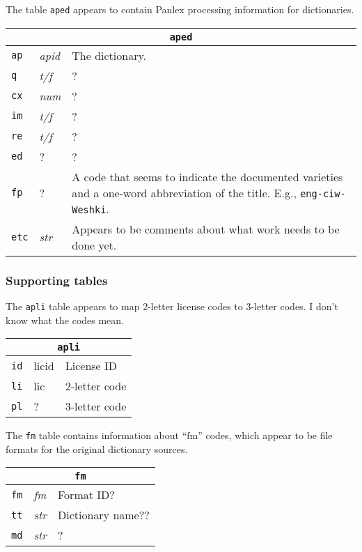 The table {\tt aped} appears to contain Panlex processing information
for dictionaries.
\begin{trivlist}\item
\begin{tabular}{|llp{3.5in}|}
\hline
\multicolumn{3}{|c|}{\tt aped}\\
\hline
{\tt ap} & {\it apid} & The dictionary.\\
{\tt q}  & {\it t/f}  & ?\\
{\tt cx} & {\it num}  & ?\\
{\tt im} & {\it t/f}  & ?\\
{\tt re} & {\it t/f}  & ?\\
{\tt ed} & ?          & ?\\
{\tt fp} & ?          & A code that seems to indicate the documented
    varieties and a one-word abbreviation of the title.  E.g., {\tt eng-ciw-Weshki}.\\
{\tt etc} & {\it str} & Appears to be comments about what work
    needs to be done yet.\\
\hline
\end{tabular}
\end{trivlist}

\subsubsection{Supporting tables}

The {\tt apli} table appears to map 2-letter license codes to
3-letter codes.  I don't know what the codes mean.

\begin{trivlist}\item
\begin{tabular}{|llp{3.5in}|}
\hline
\multicolumn{3}{|c|}{\tt apli}\\
\hline
{\tt id} & licid & License ID\\
{\tt li} & lic & 2-letter code\\
{\tt pl} & ? & 3-letter code\\
\hline
\end{tabular}
\end{trivlist}
The {\tt fm} table contains information about ``fm'' codes, which
appear to be file formats for the original dictionary sources.

\begin{trivlist}\item
\begin{tabular}{|llp{3.5in}|}
\hline
\multicolumn{3}{|c|}{\tt fm}\\
\hline
{\tt fm} & {\it fm} & Format ID?\\
{\tt tt} & {\it str} & Dictionary name??\\
{\tt md} & {\it str} & ?\\
\hline
\end{tabular}
\end{trivlist}

